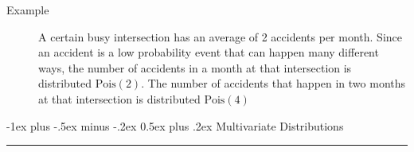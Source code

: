 \documentclass[10pt,landscape]{article}
\makeatletter
\theoremstyle{definition}
\newcommand{\Pois}{\textrm{Pois}}
\renewcommand{\section}{\@startsection{section}{1}{0mm}%
                                {-1ex plus -.5ex minus -.2ex}%
                                {0.5ex plus .2ex}%
                                {\normalfont\large\bfseries}}
\makeatother
\begin{document}
\begin{multicols}{3}
\begin{description}
\begin{description}
    \item[Example] A certain busy intersection has an average of 2 accidents per month. Since an accident is a low probability event that can happen many different ways, the number of accidents in a month at that intersection is distributed $\Pois(2)$. The number of accidents that happen in two months at that intersection is distributed $\Pois(4)$
    
\end{description}
\end{description}


\section{Multivariate Distributions} \smallskip \hrule height 2pt \smallskip



\end{multicols}
\end{document}

